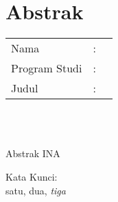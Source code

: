 %
%
%

\chapter*{Abstrak}

\vspace*{0.2cm}

\noindent \begin{tabular}{l l p{10cm}}
	Nama&: & \penulis \\
	Program Studi&: & \program \\
	Judul&: & \judul \\
\end{tabular} \\ 

\vspace*{0.5cm}

\noindent 
\\ Abstrak INA

\vspace*{0.2cm}

\noindent Kata Kunci: \\ 
\noindent satu, dua, \textit{tiga}\\ 

\newpage
